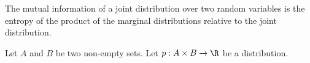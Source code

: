 


The mutual information of a joint distribution over two random variables is the entropy of the product of the marginal distributions relative to the joint distribution.


Let $A$ and $B$ be two non-empty sets.
Let $p: A \times B \to \R$ be a distribution.

\blankpage
